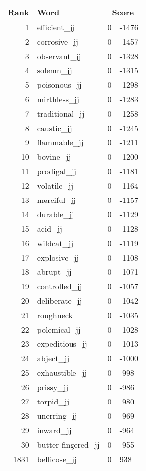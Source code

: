 \begin{longtable}[!htbp]{| rlr@{.}l |}
    \hline
    \textbf{Rank} & \textbf{Word} & \multicolumn{2}{c|}{\textbf{Score}} \\
    \hline
    \endhead
    1 & efficient\_jj & 0 & -1476 \\
    2 & corrosive\_jj & 0 & -1457 \\
    3 & observant\_jj & 0 & -1328 \\
    4 & solemn\_jj & 0 & -1315 \\
    5 & poisonous\_jj & 0 & -1298 \\
    6 & mirthless\_jj & 0 & -1283 \\
    7 & traditional\_jj & 0 & -1258 \\
    8 & caustic\_jj & 0 & -1245 \\
    9 & flammable\_jj & 0 & -1211 \\
    10 & bovine\_jj & 0 & -1200 \\
    11 & prodigal\_jj & 0 & -1181 \\
    12 & volatile\_jj & 0 & -1164 \\
    13 & merciful\_jj & 0 & -1157 \\
    14 & durable\_jj & 0 & -1129 \\
    15 & acid\_jj & 0 & -1128 \\
    16 & wildcat\_jj & 0 & -1119 \\
    17 & explosive\_jj & 0 & -1108 \\
    18 & abrupt\_jj & 0 & -1071 \\
    19 & controlled\_jj & 0 & -1057 \\
    20 & deliberate\_jj & 0 & -1042 \\
    21 & roughneck & 0 & -1035 \\
    22 & polemical\_jj & 0 & -1028 \\
    23 & expeditious\_jj & 0 & -1013 \\
    24 & abject\_jj & 0 & -1000 \\
    25 & exhaustible\_jj & 0 & -998 \\
    26 & prissy\_jj & 0 & -986 \\
    27 & torpid\_jj & 0 & -980 \\
    28 & unerring\_jj & 0 & -969 \\
    29 & inward\_jj & 0 & -964 \\
    30 & butter-fingered\_jj & 0 & -955 \\
    1831 & bellicose\_jj & 0 & 938 \\

\end{longtable}
